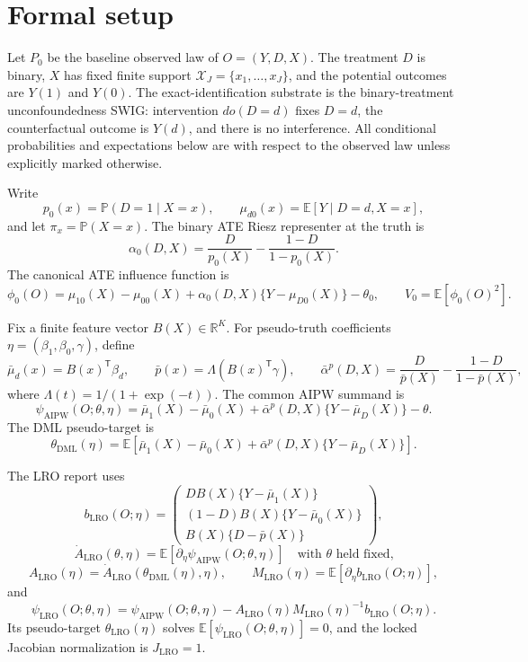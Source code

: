 \documentclass[11pt]{article}
\newcommand{\E}{\mathbb{E}}
\renewcommand{\Pr}{\mathbb{P}}
\newcommand{\transpose}{\mathsf{T}}
\newcommand{\R}{\mathbb{R}}
\theoremstyle{definition}
\theoremstyle{plain}
\theoremstyle{remark}
\begin{document}
\section{Formal setup}
Let \(P_0\) be the baseline observed law of \(O=(Y,D,X)\).  The treatment \(D\) is binary, \(X\) has fixed finite support \(\mathcal X_J=\{x_1,\ldots,x_J\}\), and the potential outcomes are \(Y(1)\) and \(Y(0)\).  The exact-identification substrate is the binary-treatment unconfoundedness SWIG: intervention \(do(D=d)\) fixes \(D=d\), the counterfactual outcome is \(Y(d)\), and there is no interference.  All conditional probabilities and expectations below are with respect to the observed law unless explicitly marked otherwise.

Write
\[
p_0(x)=\Pr(D=1\mid X=x),\qquad \mu_{d0}(x)=\E[Y\mid D=d,X=x],
\]
and let \(\pi_x=\Pr(X=x)\).  The binary ATE Riesz representer at the truth is
\[
\alpha_0(D,X)=\frac{D}{p_0(X)}-\frac{1-D}{1-p_0(X)}.
\]
The canonical ATE influence function is
\[
\phi_0(O)=\mu_{10}(X)-\mu_{00}(X)+\alpha_0(D,X)\{Y-\mu_{D0}(X)\}-\theta_0,
\qquad V_0=\E[\phi_0(O)^2].
\]

Fix a finite feature vector \(B(X)\in\R^K\).  For pseudo-truth coefficients \(\eta=(\beta_1,\beta_0,\gamma)\), define
\[
\bar\mu_d(x)=B(x)^\transpose\beta_d,\qquad
\bar p(x)=\Lambda(B(x)^\transpose\gamma),\qquad
\bar\alpha^p(D,X)=\frac{D}{\bar p(X)}-\frac{1-D}{1-\bar p(X)},
\]
where \(\Lambda(t)=1/(1+\exp(-t))\).  The common AIPW summand is
\[
\psi_{\mathrm{AIPW}}(O;\theta,\eta)
=\bar\mu_1(X)-\bar\mu_0(X)+\bar\alpha^p(D,X)\{Y-\bar\mu_D(X)\}-\theta.
\]
The DML pseudo-target is
\[
\theta_{\mathrm{DML}}(\eta)=
\E[\bar\mu_1(X)-\bar\mu_0(X)+\bar\alpha^p(D,X)\{Y-\bar\mu_D(X)\}].
\]

The LRO report uses
\[
b_{\mathrm{LRO}}(O;\eta)=
\begin{pmatrix}
D B(X)\{Y-\bar\mu_1(X)\}\\
(1-D)B(X)\{Y-\bar\mu_0(X)\}\\
B(X)\{D-\bar p(X)\}
\end{pmatrix},
\]
\[
\dot A_{\mathrm{LRO}}(\theta,\eta)=\E[\partial_\eta\psi_{\mathrm{AIPW}}(O;\theta,\eta)]
\quad\text{with \(\theta\) held fixed,}
\]
\[
A_{\mathrm{LRO}}(\eta)=\dot A_{\mathrm{LRO}}(\theta_{\mathrm{DML}}(\eta),\eta),\qquad
M_{\mathrm{LRO}}(\eta)=\E[\partial_\eta b_{\mathrm{LRO}}(O;\eta)],
\]
and
\[
\psi_{\mathrm{LRO}}(O;\theta,\eta)=
\psi_{\mathrm{AIPW}}(O;\theta,\eta)
-A_{\mathrm{LRO}}(\eta)M_{\mathrm{LRO}}(\eta)^{-1}b_{\mathrm{LRO}}(O;\eta).
\]
Its pseudo-target \(\theta_{\mathrm{LRO}}(\eta)\) solves \(\E[\psi_{\mathrm{LRO}}(O;\theta,\eta)]=0\), and the locked Jacobian normalization is \(J_{\mathrm{LRO}}=1\).
\end{document}
